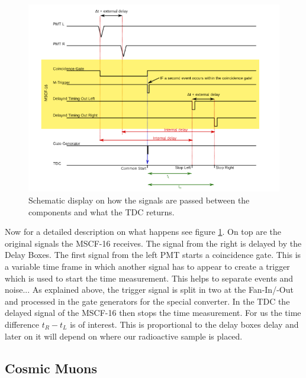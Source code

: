 \documentclass[]{article}
\begin{document}
\begin{figure}[H]
\centering
\includegraphics[width=1\textwidth]{Plots/Timing.png}
\caption{Schematic display on how the signals are passed between the components and what the TDC returns. \cite{script}}
\label{fig:timing}
\end{figure}

Now for a detailed description on what happens see figure \ref{fig:timing}. On top are the original signals the MSCF-16 receives. The signal from the right is delayed by the Delay Boxes. The first signal from the left PMT starts a coincidence gate. This is a variable time frame in which another signal has to appear to create a trigger which is used to start the time measurement. This helps to separate events and noise...
As explained above, the trigger signal is split in two at the Fan-In/-Out and processed in the gate generators for the special converter. In the TDC the delayed signal of the MSCF-16 then stops the time measurement. For us the time difference $t_R - t_L$ is of interest. This is proportional to the delay boxes delay and later on it will depend on where our radioactive sample is placed.

\subsection{Cosmic Muons} %
\end{document}
